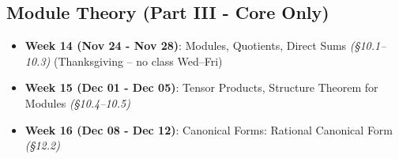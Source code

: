 \documentclass{article}
\begin{document}
\subsection*{Module Theory (Part III - Core Only)}
\begin{itemize}
    \item \textbf{Week 14 (Nov 24 - Nov 28)}: Modules, Quotients, Direct Sums \textit{(§10.1–10.3)} (Thanksgiving – no class Wed–Fri)
    \item \textbf{Week 15 (Dec 01 - Dec 05)}: Tensor Products, Structure Theorem for Modules \textit{(§10.4–10.5)}
    \item \textbf{Week 16 (Dec 08 - Dec 12)}: Canonical Forms: Rational Canonical Form \textit{(§12.2)}
\end{itemize}
\end{document}
